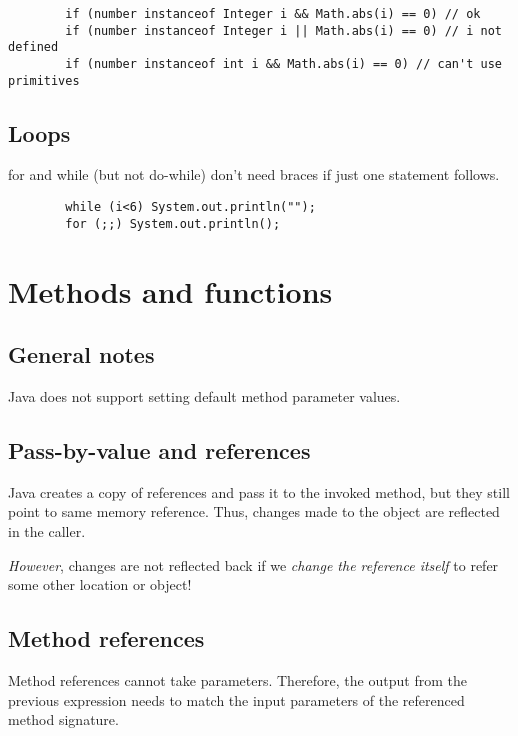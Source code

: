 \documentclass{scrartcl}
\begin{document}
    \begin{lstlisting}
        if (number instanceof Integer i && Math.abs(i) == 0) // ok
        if (number instanceof Integer i || Math.abs(i) == 0) // i not defined
        if (number instanceof int i && Math.abs(i) == 0) // can't use primitives
    \end{lstlisting}

\subsection{Loops}

    for and while (but not do-while) don't need braces if just one statement follows.

    \begin{lstlisting}
        while (i<6) System.out.println("");
        for (;;) System.out.println();
    \end{lstlisting}

\section{Methods and functions}
\subsection{General notes}

    Java does not support setting default method parameter values.

\subsection{Pass-by-value and references}

    Java creates a copy of references and pass it to the invoked method,     but they still point to same memory reference. Thus, changes made to the object are reflected in the caller.

    \textit{However}, changes are not reflected back if we \textit{change the reference itself} to refer some other location or object!


\subsection{Method references}

    Method references cannot take parameters. Therefore, the output from the previous expression needs to match the input parameters of the referenced method signature.
\end{document}
